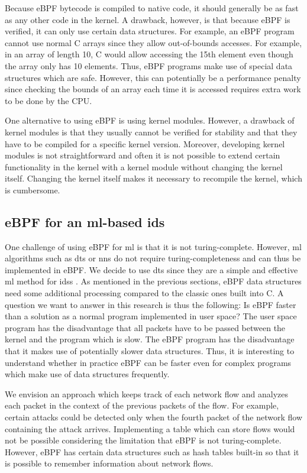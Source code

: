 \documentclass[conference]{IEEEtran}
\begin{document}
Because eBPF bytecode is compiled to native code, it should generally be as fast as any other code in the kernel. A drawback, however, is that because eBPF is verified, it can only use certain data structures. For example, an eBPF program cannot use normal C arrays since they allow out-of-bounds accesses. For example, in an array of length 10, C would allow accessing the 15th element even though the array only has 10 elements. Thus, eBPF programs make use of special data structures which are safe. However, this can potentially be a performance penalty since checking the bounds of an array each time it is accessed requires extra work to be done by the CPU. 

One alternative to using eBPF is using kernel modules. However, a drawback of kernel modules is that they usually cannot be verified for stability and that they have to be compiled for a specific kernel version. Moreover, developing kernel modules is not straightforward and often it is not possible to extend certain functionality in the kernel with a kernel module without changing the kernel itself. Changing the kernel itself makes it necessary to recompile the kernel, which is cumbersome. 

\subsection{eBPF for an \gls{ml}-based \gls{ids}}

One challenge of using eBPF for \gls{ml} is that it is not turing-complete. However, \gls{ml} algorithms such as \glspl{dt} or \glspl{nn} do not require turing-completeness and can thus be implemented in eBPF. We decide to use \glspl{dt} since they are a simple and effective \gls{ml} method for \glspl{ids} \cite{iglesias_ntarc_2020}. As mentioned in the previous sections, eBPF data structures need some additional processing compared to the classic ones built into C. A question we want to answer in this research is thus the following: Is eBPF faster than a solution as a normal program implemented in user space? The user space program has the disadvantage that all packets have to be passed between the kernel and the program which is slow. The eBPF program has the disadvantage that it makes use of potentially slower data structures. Thus, it is interesting to understand whether in practice eBPF can be faster even for complex programs which make use of data structures frequently. 

We envision an approach which keeps track of each network flow and analyzes each packet in the context of the previous packets of the flow. For example, certain attacks could be detected only when the fourth packet of the network flow containing the attack arrives. Implementing a table which can store flows would not be possible considering the limitation that eBPF is not turing-complete. However, eBPF has certain data structures such as hash tables built-in so that it is possible to remember information about network flows. 
\end{document}
